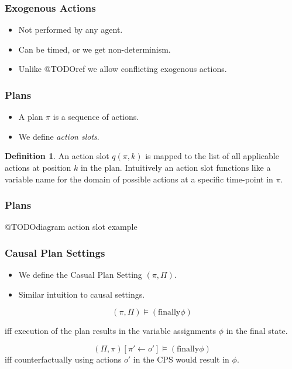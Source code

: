 \documentclass{beamer}
\theoremstyle{plain}
\theoremstyle{definition}
\newtheorem{defn}[thm]{Definition} %
\begin{document}
\begin{frame}
\frametitle{Exogenous Actions}
\begin{itemize}
\item Not performed by any agent.
\item Can be timed, or we get non-determinism.
\item Unlike @TODOref we allow conflicting exogenous actions.
\end{itemize}

\end{frame}


\begin{frame}
\frametitle{Plans}
\begin{itemize}
\item A plan $\pi$ is a sequence of actions. 

\item We define \textit{action slots}. 

\end{itemize}


\begin{defn}
An action slot $q(\pi,k)$ is mapped to the list of all applicable actions at position $k$ in the plan. Intuitively an action slot functions like a variable name for the domain of possible actions at a specific time-point in $\pi$.
\end{defn}

\end{frame}

\begin{frame}
\frametitle{Plans}
@TODOdiagram action slot example
\end{frame}


\begin{frame}
\frametitle{Causal Plan Settings}
\begin{itemize}
\item We define the Casual Plan Setting $(\pi, \Pi)$.
\item Similar intuition to causal settings.
\newline
\end{itemize}


\[
(\pi,\Pi)\models (\textrm{finally} \phi)
\]

iff execution of the plan results in the variable assignments $\phi$ in the final state.

\[
(\Pi, \pi)[\pi'\leftarrow o'] \models (\textrm{finally} \phi)
\]
iff counterfactually using actions $o'$ in the CPS would result in $\phi$.

\end{frame}
\end{document}
